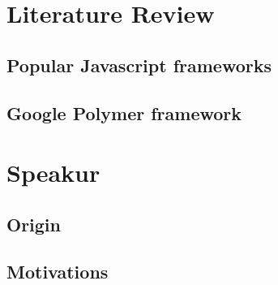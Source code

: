 \section{Literature Review}
\subsection{Popular Javascript frameworks}
\subsection{Google Polymer framework}

\section{Speakur}
\subsection{Origin}
\subsection{Motivations}

